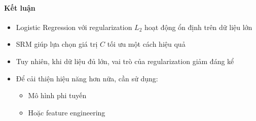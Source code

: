 \paragraph{Kết luận}

\begin{itemize}
    \item Logistic Regression với regularization $L_2$ hoạt động ổn định trên dữ liệu lớn
    
    \item SRM giúp lựa chọn giá trị $C$ tối ưu một cách hiệu quả
    
    \item Tuy nhiên, khi dữ liệu đủ lớn, vai trò của regularization giảm đáng kể
    
    \item Để cải thiện hiệu năng hơn nữa, cần sử dụng:
    \begin{itemize}
        \item Mô hình phi tuyến
        \item Hoặc feature engineering
    \end{itemize}
\end{itemize}


